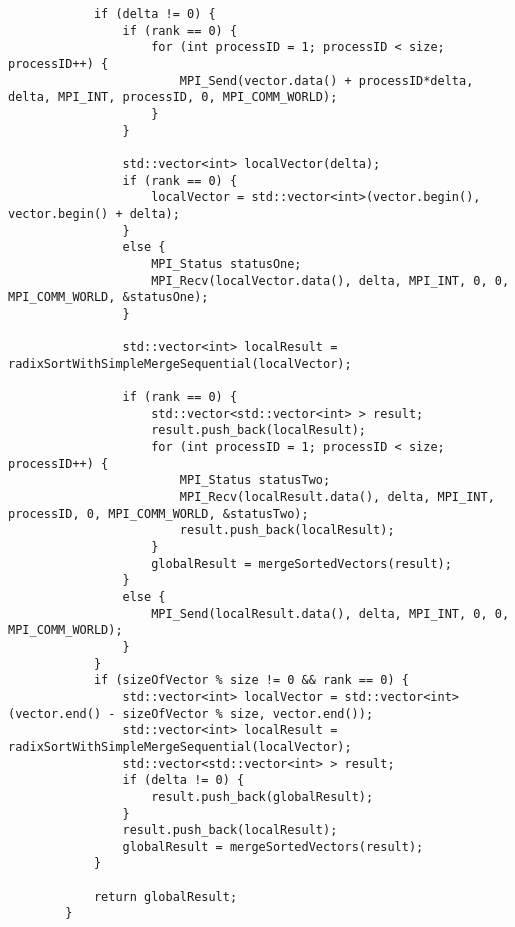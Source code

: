 \documentclass[a4paper, 14pt]{article}
\begin{document}
\begin{verbatim}
			if (delta != 0) {
				if (rank == 0) {
					for (int processID = 1; processID < size; processID++) {
						MPI_Send(vector.data() + processID*delta, delta, MPI_INT, processID, 0, MPI_COMM_WORLD);
					}
				}
				
				std::vector<int> localVector(delta);
				if (rank == 0) {
					localVector = std::vector<int>(vector.begin(), vector.begin() + delta);
				}
				else {
					MPI_Status statusOne;
					MPI_Recv(localVector.data(), delta, MPI_INT, 0, 0, MPI_COMM_WORLD, &statusOne);
				}
				
				std::vector<int> localResult = radixSortWithSimpleMergeSequential(localVector);
				
				if (rank == 0) {
					std::vector<std::vector<int> > result;
					result.push_back(localResult);
					for (int processID = 1; processID < size; processID++) {
						MPI_Status statusTwo;
						MPI_Recv(localResult.data(), delta, MPI_INT, processID, 0, MPI_COMM_WORLD, &statusTwo);
						result.push_back(localResult);
					}
					globalResult = mergeSortedVectors(result);
				}
				else {
					MPI_Send(localResult.data(), delta, MPI_INT, 0, 0, MPI_COMM_WORLD);
				}
			}
			if (sizeOfVector % size != 0 && rank == 0) {
				std::vector<int> localVector = std::vector<int>(vector.end() - sizeOfVector % size, vector.end());
				std::vector<int> localResult = radixSortWithSimpleMergeSequential(localVector);
				std::vector<std::vector<int> > result;
				if (delta != 0) {
					result.push_back(globalResult);
				}
				result.push_back(localResult);
				globalResult = mergeSortedVectors(result);
			}
			
			return globalResult;
		}
	\end{verbatim}
\end{document}
